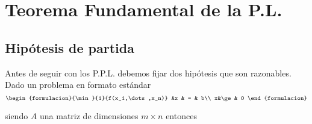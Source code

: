 \section{Teorema Fundamental de la P.L.}
\subsection{Hipótesis de partida}

Antes de seguir con los P.P.L. debemos fijar dos hipótesis que son razonables. Dado un problema en formato estándar
$$
\begin{formulacion}{\min}{1}{f(x_1,\dots,x_n)}
  Ax & = & b\\
  x&\ge & 0
\end{formulacion}$$

siendo $A$ una matriz de dimensiones $m\times n$ entonces

